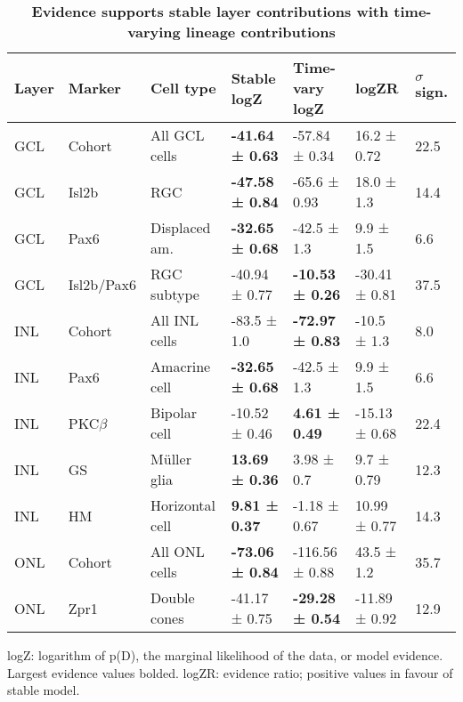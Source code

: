 \begin{table}[!ht]
    \caption{{\bf Evidence supports stable layer contributions with time-varying lineage contributions}}
    \begin{tabular}{|l|l|l|l|l|l|l|} 
        \hline
        {\bf Layer} & {\bf Marker} & {\bf Cell type} & {\bf Stable logZ} & {\bf Time-vary logZ} & {\bf logZR} & {\bf $\sigma$ sign.}\\ \hline \hline
        GCL & Cohort & All GCL cells & {\bf -41.64 ± 0.63} & -57.84 ± 0.34 & 16.2 ± 0.72 & 22.5\\ \hline \hline
        GCL & Isl2b & RGC & {\bf -47.58 ± 0.84} & -65.6 ± 0.93 & 18.0 ± 1.3 & 14.4\\ \hline
        GCL & Pax6 & Displaced am. & {\bf -32.65 ± 0.68} & -42.5 ± 1.3 & 9.9 ± 1.5 & 6.6\\ \hline
        GCL & Isl2b/Pax6 & RGC subtype & -40.94 ± 0.77 & {\bf -10.53 ± 0.26} & -30.41 ± 0.81 & 37.5\\ \hline \hline
        INL & Cohort & All INL cells & -83.5 ± 1.0 & {\bf -72.97 ± 0.83} & -10.5 ± 1.3 & 8.0\\ \hline \hline
        INL & Pax6 & Amacrine cell & {\bf -32.65 ± 0.68} & -42.5 ± 1.3 & 9.9 ± 1.5 & 6.6\\ \hline
        INL & PKC$\beta$ & Bipolar cell & -10.52 ± 0.46 & {\bf 4.61 ± 0.49} & -15.13 ± 0.68 & 22.4\\ \hline
        INL & GS & M\"{u}ller glia & {\bf 13.69 ± 0.36} & 3.98 ± 0.7 & 9.7 ± 0.79 & 12.3\\ \hline
        INL & HM & Horizontal cell & {\bf 9.81 ± 0.37} & -1.18 ± 0.67 & 10.99 ± 0.77 & 14.3\\ \hline \hline
        ONL & Cohort & All ONL cells & {\bf -73.06 ± 0.84} & -116.56 ± 0.88 & 43.5 ± 1.2 & 35.7\\\hline \hline
        ONL & Zpr1 & Double cones &  -41.17 ± 0.75 & {\bf -29.28 ± 0.54} & -11.89 ± 0.92 & 12.9\\  \hline
    \end{tabular}
   
    \begin{flushleft}logZ: logarithm of p(D), the marginal likelihood of the data, or model evidence.  Largest evidence values bolded. logZR: evidence ratio; positive values in favour of stable model.
    \end{flushleft}
    \label{lineage_ev}
\end{table}

